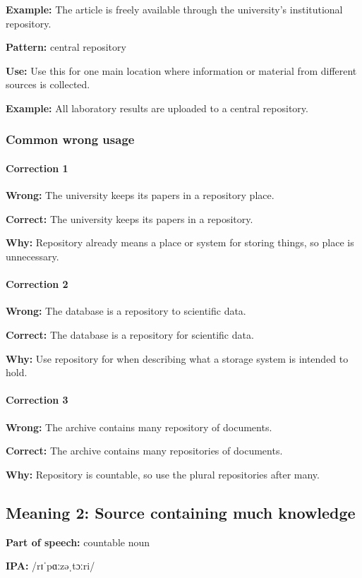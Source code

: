 \documentclass[11pt]{article}
\begin{document}
\textbf{Example:} The article is freely available through the university's institutional repository.

\textbf{Pattern:} central repository

\textbf{Use:} Use this for one main location where information or material from different sources is collected.

\textbf{Example:} All laboratory results are uploaded to a central repository.

\subsubsection{Common wrong usage}
\paragraph{Correction 1}
\textbf{Wrong:} The university keeps its papers in a repository place.

\textbf{Correct:} The university keeps its papers in a repository.

\textbf{Why:} Repository already means a place or system for storing things, so place is unnecessary.

\paragraph{Correction 2}
\textbf{Wrong:} The database is a repository to scientific data.

\textbf{Correct:} The database is a repository for scientific data.

\textbf{Why:} Use repository for when describing what a storage system is intended to hold.

\paragraph{Correction 3}
\textbf{Wrong:} The archive contains many repository of documents.

\textbf{Correct:} The archive contains many repositories of documents.

\textbf{Why:} Repository is countable, so use the plural repositories after many.

\subsection{Meaning 2: Source containing much knowledge}
\textbf{Part of speech:} countable noun

\textbf{IPA:} /rɪˈpɑːzəˌtɔːri/
\end{document}
